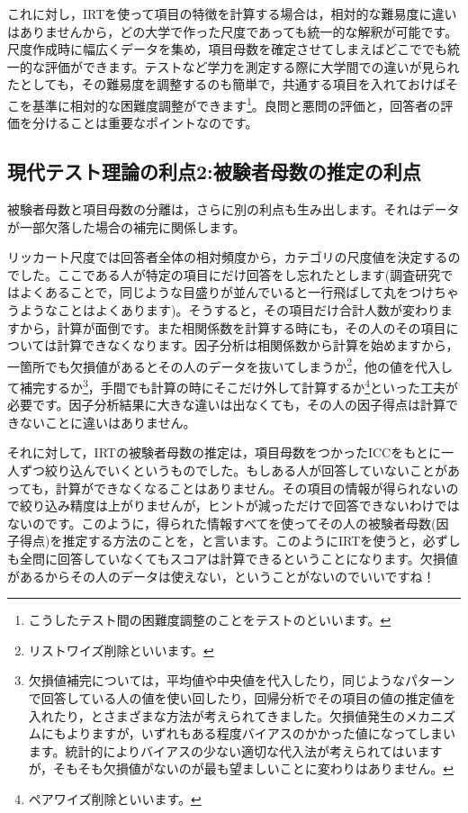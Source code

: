 \documentclass{ltjsbook}
\begin{document}
これに対し，IRTを使って項目の特徴を計算する場合は，相対的な難易度に違いはありませんから，どの大学で作った尺度であっても統一的な解釈が可能です。尺度作成時に幅広くデータを集め，項目母数を確定させてしまえばどこででも統一的な評価ができます。テストなど学力を測定する際に大学間での違いが見られたとしても，その難易度を調整するのも簡単で，共通する項目を入れておけばそこを基準に相対的な困難度調整ができます\footnote{こうしたテスト間の困難度調整のことをテストのといいます。}。良問と悪問の評価と，回答者の評価を分けることは重要なポイントなのです。
\subsection{現代テスト理論の利点2:被験者母数の推定の利点}
被験者母数と項目母数の分離は，さらに別の利点も生み出します。それはデータが一部欠落した場合の補完に関係します。

リッカート尺度では回答者全体の相対頻度から，カテゴリの尺度値を決定するのでした。ここである人が特定の項目にだけ回答をし忘れたとします(調査研究ではよくあることで，同じような目盛りが並んでいると一行飛ばして丸をつけちゃうようなことはよくあります)。そうすると，その項目だけ合計人数が変わりますから，計算が面倒です。また相関係数を計算する時にも，その人のその項目については計算できなくなります。因子分析は相関係数から計算を始めますから，一箇所でも欠損値があるとその人のデータを抜いてしまうか\footnote{リストワイズ削除といいます。}，他の値を代入して補完するか\footnote{欠損値補完については，平均値や中央値を代入したり，同じようなパターンで回答している人の値を使い回したり，回帰分析でその項目の値の推定値を入れたり，とさまざまな方法が考えられてきました。欠損値発生のメカニズムにもよりますが，いずれもある程度バイアスのかかった値になってしまいます。統計的によりバイアスの少ない適切な代入法が考えられてはいますが，そもそも欠損値がないのが最も望ましいことに変わりはありません。}，手間でも計算の時にそこだけ外して計算するか\footnote{ペアワイズ削除といいます。}といった工夫が必要です。因子分析結果に大きな違いは出なくても，その人の因子得点は計算できないことに違いはありません。

それに対して，IRTの被験者母数の推定は，項目母数をつかったICCをもとに一人ずつ絞り込んでいくというものでした。もしある人が回答していないことがあっても，計算ができなくなることはありません。その項目の情報が得られないので絞り込み精度は上がりませんが，ヒントが減っただけで回答できないわけではないのです。このように，得られた情報すべてを使ってその人の被験者母数(因子得点)を推定する方法のことを，と言います。このようにIRTを使うと，必ずしも全問に回答していなくてもスコアは計算できるということになります。欠損値があるからその人のデータは使えない，ということがないのでいいですね！
\end{document}

